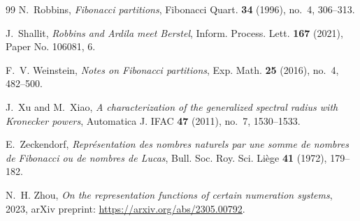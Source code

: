 \documentclass[11pt]{article}
\theoremstyle{remark}\newtheorem{remark}[theorem]{Remark}
\begin{document}
\begin{thebibliography}{99}
	N.~Robbins, \emph{Fibonacci partitions}, Fibonacci Quart. \textbf{34} (1996),
	no.~4, 306--313.
	
	J.~Shallit, \emph{Robbins and {A}rdila meet {B}erstel}, Inform. Process. Lett.
	\textbf{167} (2021), Paper No. 106081, 6.
	
	F.~V. Weinstein, \emph{Notes on {F}ibonacci partitions}, Exp. Math. \textbf{25}
	(2016), no.~4, 482--500.
	
	J.~Xu and M.~Xiao, \emph{A characterization of the generalized spectral radius
		with {K}ronecker powers}, Automatica J. IFAC \textbf{47} (2011), no.~7,
	1530--1533.
	
	E.~Zeckendorf, \emph{Repr\'{e}sentation des nombres naturels par une somme de
		nombres de {F}ibonacci ou de nombres de {L}ucas}, Bull. Soc. Roy. Sci.
	Li\`ege \textbf{41} (1972), 179--182.
	
	N.~H. Zhou, \emph{On the representation functions of certain numeration
		systems}, 2023, arXiv preprint: \url{https://arxiv.org/abs/2305.00792}.

\end{thebibliography}
\end{document}
